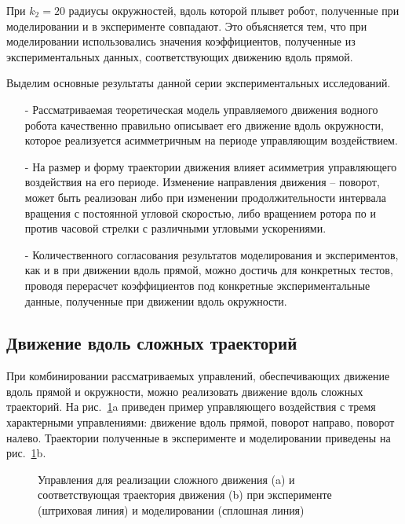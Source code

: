 При $k_2 = 20$ радиусы окружностей, вдоль которой плывет робот, полученные при моделировании и в эксперименте совпадают. Это объясняется тем, что при моделировании использовались значения   коэффициентов, полученные из экспериментальных данных, соответствующих движению вдоль прямой.

Выделим основные результаты данной серии экспериментальных исследований.

\begin{itemize}
	\item [-] Рассматриваемая теоретическая модель управляемого движения водного робота качественно правильно  описывает его движение вдоль окружности, которое реализуется асимметричным на периоде управляющим воздействием.
	
	\item [-] На размер и форму траектории движения влияет асимметрия управляющего воздействия на его периоде. Изменение направления движения -- поворот, может быть реализован либо при изменении продолжительности интервала вращения с постоянной угловой скоростью, либо вращением ротора по и против часовой стрелки с различными угловыми ускорениями.
	
	\item [-] Количественного согласования результатов моделирования и экспериментов, как и в при движении вдоль прямой, можно достичь для конкретных тестов, проводя перерасчет коэффициентов под конкретные экспериментальные данные, полученные при движении вдоль окружности.
	
\end{itemize}

\subsection{Движение вдоль сложных траекторий}

При комбинировании рассматриваемых управлений, обеспечивающих движение вдоль прямой и окружности, можно реализовать движение вдоль сложных траекторий. На рис.~\ref{Slalom}a приведен пример управляющего воздействия с тремя характерными управлениями: движение вдоль прямой, поворот направо, поворот налево.   Траектории полученные в эксперименте и моделировании приведены на рис.~\ref{Slalom}b.

\begin{figure}[!ht]
	\begin{minipage}[h]{0.5\linewidth}
	\end{minipage}
	\hfill
	\begin{minipage}[h]{0.5\linewidth}
	\end{minipage}
	\caption{Управления для реализации сложного движения (a) и соответствующая траектория движения (b)  при эксперименте (штриховая линия) и моделировании (сплошная линия)}
	\label{Slalom}
\end{figure}

